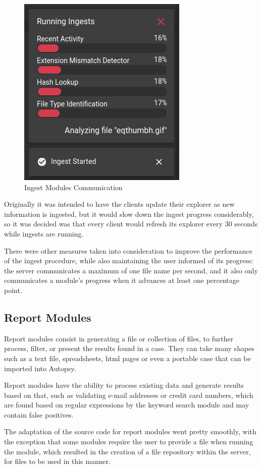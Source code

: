 \begin{figure}[ht]
 \centering
 \includegraphics[width=0.55\linewidth]{imgs/modules.png}
 \caption{Ingest Modules Communication}
 \label{fig:modules}
\end{figure}

Originally it was intended to have the clients update their explorer as new information is ingested, but it would slow down the ingest progress considerably, so it was decided was that every client would refresh 
its explorer every 30 seconds while ingests are running.

There were other measures taken into consideration to improve the performance of the ingest procedure, while also maintaining the user informed of its progress: the server communicates a maximum of one file name per
second, and it also only communicates a module's progress when it advances at least one percentage point.

\subsection{Report Modules}

Report modules consist in generating a file or collection of files, to further process, filter, or present the results found in a case. They can take many shapes such as a text file, spreadsheets, \acrshort{html} pages or even a portable case that can be imported into Autopsy.

Report modules have the ability to process existing data and generate results based on that, such as validating e-mail addresses or credit card numbers, 
which are found based on regular expressions by the keyword search module and may contain false positives.

The adaptation of the source code for report modules went pretty smoothly, with the exception that some modules require the user to provide a file when running the module, which resulted in the creation of a file repository within the server, for files to be used in this manner.

